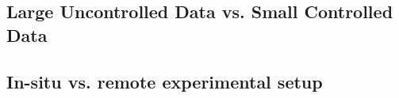 
\subsection{Large Uncontrolled Data vs. Small Controlled Data}






\subsection{In-situ vs. remote experimental setup}





